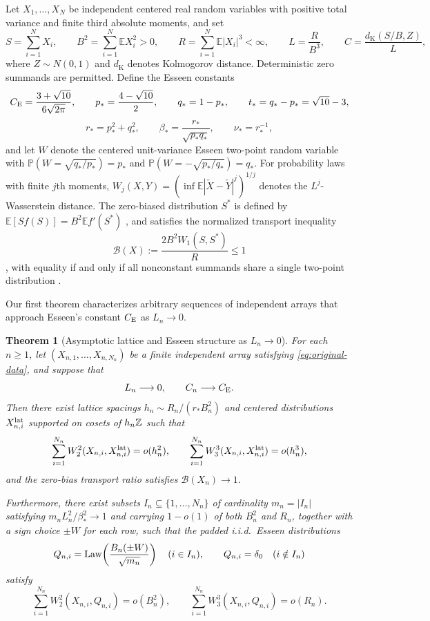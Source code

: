 \documentclass[11pt]{article}
\numberwithin{equation}{section}
\newtheorem{theorem}{Theorem}[section]
\theoremstyle{remark}\newtheorem{remark}[theorem]{Remark}
\newcommand{\E}{\mathbb E}\newcommand{\Pp}{\mathbb P}
\newcommand{\pe}{p_*}\newcommand{\qe}{q_*}\newcommand{\re}{r_*}
\newcommand{\te}{t_*}\newcommand{\be}{\beta_*}\newcommand{\nus}{\nu_*}
\begin{document}
Let $X_1,\ldots,X_N$ be independent centered real random variables with
positive total variance and finite third absolute moments, and set
\begin{equation}\label{eq:original-data}
 S=\sum_{i=1}^N X_i,\qquad B^2=\sum_{i=1}^N\E X_i^2>0,\qquad
 R=\sum_{i=1}^N\E|X_i|^3<\infty,\qquad L=\frac{R}{B^3},\qquad
 C=\frac{d_{\mathrm K}(S/B,Z)}{L},
\end{equation}
where $Z\sim N(0,1)$ and $d_{\mathrm K}$ denotes Kolmogorov distance.
Deterministic zero summands are permitted. Define the Esseen constants
\[
 \ce=\frac{3+\sqrt{10}}{6\sqrt{2\pi}},\qquad
 \pe=\frac{4-\sqrt{10}}2,\qquad\qe=1-\pe,\qquad
 \te=\qe-\pe=\sqrt{10}-3,
\]
\[
 \re=\pe^2+\qe^2,\qquad
 \be=\frac{\re}{\sqrt{\pe\qe}},\qquad\nus=\re^{-1},
\]
and let $W$ denote the centered unit-variance Esseen two-point random
variable with $\Pp(W=\sqrt{\qe/\pe})=\pe$ and $\Pp(W=-\sqrt{\pe/\qe})=\qe$.
For probability laws with finite $j$th moments, $W_j(X,Y)=(\inf\E|\widetilde X-\widetilde Y|^j)^{1/j}$
denotes the $L^j$-Wasserstein distance. The zero-biased distribution $S^*$ is
defined by $\E[Sf(S)]=B^2\E f'(S^*)$ \citep{GoldsteinReinert1997}, and
satisfies the normalized transport inequality
\begin{equation}\label{eq:additive}
 \mathcal B(X):=\frac{2B^2W_1(S,S^*)}{R}\le1
\end{equation}
\citep{Goldstein2010,Tyurin2009}, with equality if and only if all nonconstant
summands share a single two-point distribution \citep[Theorem~1.1]{BellTransport2026}.

Our first theorem characterizes arbitrary sequences of independent arrays
that approach Esseen's constant $C_{\mathrm E}$ as $L_n\to0$.

\begin{theorem}[Asymptotic lattice and Esseen structure as $L_n\to0$]\label{thm:near}
For each $n\ge1$, let $(X_{n,1},\ldots,X_{n,N_n})$ be a finite independent
array satisfying \eqref{eq:original-data}, and suppose that
\begin{equation}\label{eq:near-assumption}
                         L_n\longrightarrow0,
                  \qquad C_n\longrightarrow C_{\mathrm E}.
\end{equation}
Then there exist lattice spacings $h_n\sim R_n/(\re B_n^2)$ and centered
distributions $X_{n,i}^{\rm lat}$ supported on cosets of $h_n\mathbb Z$ such that
\begin{equation}\label{eq:strong-lattice}
 \sum_{i=1}^{N_n}W_2^2(X_{n,i},X_{n,i}^{\rm lat})=o(h_n^2),\qquad
 \sum_{i=1}^{N_n}W_3^3(X_{n,i},X_{n,i}^{\rm lat})=o(h_n^3),
\end{equation}
and the zero-bias transport ratio satisfies $\mathcal B(X_n)\to1$.

Furthermore, there exist subsets $I_n\subseteq\{1,\ldots,N_n\}$ of cardinality
$m_n=|I_n|$ satisfying $m_nL_n^2/\be^2\to1$ and carrying $1-o(1)$ of both
$B_n^2$ and $R_n$, together with a sign choice $\pm W$ for each row, such that
the padded i.i.d.\ Esseen distributions
\[
 Q_{n,i}=\operatorname{Law}\!\left(\frac{B_n(\pm W)}{\sqrt{m_n}}\right)\quad(i\in I_n),\qquad
 Q_{n,i}=\delta_0\quad(i\notin I_n)
\]
satisfy
\[
 \sum_{i=1}^{N_n}W_2^2(X_{n,i},Q_{n,i})=o(B_n^2),\qquad
 \sum_{i=1}^{N_n}W_3^3(X_{n,i},Q_{n,i})=o(R_n).
\]
\end{theorem}
\end{document}
